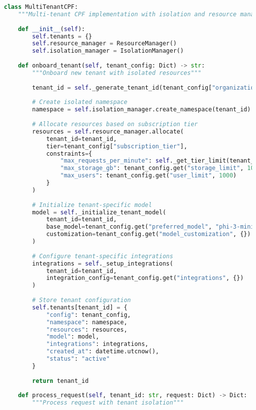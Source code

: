 \documentclass[11pt,a4paper]{article}
\begin{document}
\begin{lstlisting}[language=Python, caption=Multi-Tenant CPF Implementation]
class MultiTenantCPF:
    """Multi-tenant CPF implementation with isolation and resource management"""
    
    def __init__(self):
        self.tenants = {}
        self.resource_manager = ResourceManager()
        self.isolation_manager = IsolationManager()
        
    def onboard_tenant(self, tenant_config: Dict) -> str:
        """Onboard new tenant with isolated resources"""
        
        tenant_id = self._generate_tenant_id(tenant_config["organization"])
        
        # Create isolated namespace
        namespace = self.isolation_manager.create_namespace(tenant_id)
        
        # Allocate resources based on subscription tier
        resources = self.resource_manager.allocate(
            tenant_id=tenant_id,
            tier=tenant_config["subscription_tier"],
            constraints={
                "max_requests_per_minute": self._get_tier_limit(tenant_config["subscription_tier"]),
                "max_storage_gb": tenant_config.get("storage_limit", 100),
                "max_users": tenant_config.get("user_limit", 1000)
            }
        )
        
        # Initialize tenant-specific model
        model = self._initialize_tenant_model(
            tenant_id=tenant_id,
            base_model=tenant_config.get("preferred_model", "phi-3-mini"),
            customization=tenant_config.get("model_customization", {})
        )
        
        # Configure tenant-specific integrations
        integrations = self._setup_integrations(
            tenant_id=tenant_id,
            integration_config=tenant_config.get("integrations", {})
        )
        
        # Store tenant configuration
        self.tenants[tenant_id] = {
            "config": tenant_config,
            "namespace": namespace,
            "resources": resources,
            "model": model,
            "integrations": integrations,
            "created_at": datetime.utcnow(),
            "status": "active"
        }
        
        return tenant_id
    
    def process_request(self, tenant_id: str, request: Dict) -> Dict:
        """Process request with tenant isolation"""
        

\end{lstlisting}
\end{document}
